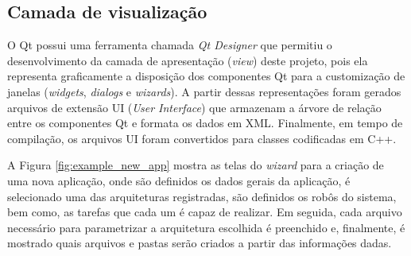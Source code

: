             
            
        \subsection{Camada de visualização} \label{subsec:rqt_mrta_view}
            O Qt \cite{ref:yafei2012qt} possui uma ferramenta chamada \textit{Qt Designer} que permitiu o desenvolvimento da camada de apresentação (\textit{view}) deste projeto, pois ela representa graficamente a disposição dos componentes Qt para a customização de janelas (\textit{widgets}, \textit{dialogs} e \textit{wizards}). A partir dessas representações foram gerados arquivos de extensão UI (\textit{User Interface}) que armazenam a árvore de relação entre os componentes Qt e formata os dados em XML. Finalmente, em tempo de compilação, os arquivos UI foram convertidos para classes codificadas em C++.
            
            A Figura \ref{fig:example_new_app} mostra as telas do \textit{wizard} para a criação de uma nova aplicação, onde são definidos os dados gerais da aplicação, é selecionado uma das arquiteturas registradas, são definidos os robôs do sistema, bem como, as tarefas que cada um é capaz de realizar. Em seguida, cada arquivo necessário para parametrizar a arquitetura escolhida é preenchido e, finalmente, é mostrado quais arquivos e pastas serão criados a partir das informações dadas.
            
